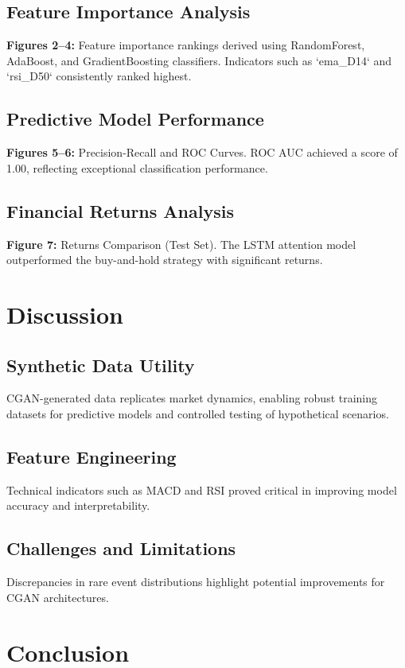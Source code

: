 \documentclass[conference]{IEEEtran}
\begin{document}
\subsection{Feature Importance Analysis}
\textbf{Figures 2--4:} Feature importance rankings derived using RandomForest, AdaBoost, and GradientBoosting classifiers. Indicators such as `ema\_D14` and `rsi\_D50` consistently ranked highest.

\subsection{Predictive Model Performance}
\textbf{Figures 5--6:} Precision-Recall and ROC Curves. ROC AUC achieved a score of 1.00, reflecting exceptional classification performance.

\subsection{Financial Returns Analysis}
\textbf{Figure 7:} Returns Comparison (Test Set). The LSTM attention model outperformed the buy-and-hold strategy with significant returns.

\section{Discussion}
\subsection{Synthetic Data Utility}
CGAN-generated data replicates market dynamics, enabling robust training datasets for predictive models and controlled testing of hypothetical scenarios.

\subsection{Feature Engineering}
Technical indicators such as MACD and RSI proved critical in improving model accuracy and interpretability.

\subsection{Challenges and Limitations}
Discrepancies in rare event distributions highlight potential improvements for CGAN architectures.

\section{Conclusion}
\end{document}
